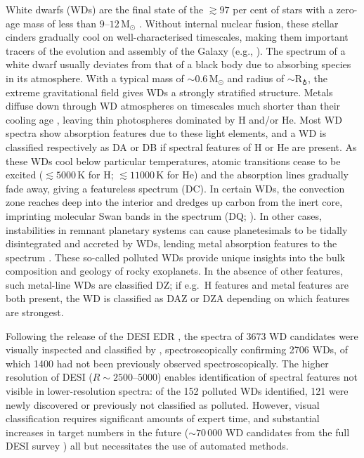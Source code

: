 \documentclass[fleqn,usenatbib]{mnras}
\begin{document}
White dwarfs (WDs) are the final state of the $\gtrsim97$ per cent of stars with a zero-age mass of less than $9$--$12\,\mathrm{M}_\odot$ \citep{lauffer18, althaus10, althaus21}.
Without internal nuclear fusion, these stellar cinders gradually cool on well-characterised timescales, making them important tracers of the evolution and assembly of the Galaxy (e.g., \citealt{winget87, tremblay14}).
The spectrum of a white dwarf usually deviates from that of a black body due to absorbing species in its atmosphere.
With a typical mass of $\sim0.6\,\mathrm{M}_\odot$ and radius of $\sim \mathrm{R}_{\earth}$, the extreme gravitational field gives WDs a strongly stratified structure.
Metals diffuse down through WD atmospheres on timescales much shorter than their cooling age \citep{schatzman45, paquette86, koester09, wyatt14}, leaving thin photospheres dominated by H and/or He.
Most WD spectra show absorption features due to these light elements, and a WD is classified respectively as DA or DB if spectral features of H or He are present.
As these WDs cool below particular temperatures, atomic transitions cease to be excited ($\lesssim5000\,\text{K}$ for H; $\lesssim 11000\,\text{K}$ for He) and the absorption lines gradually fade away, giving a featureless spectrum (DC).
In certain WDs, the convection zone reaches deep into the interior and dredges up carbon from the inert core, imprinting molecular  Swan bands in the spectrum (DQ; \citealt{fontaine84, koester82, koester20, blouin23}).
In other cases, instabilities in remnant planetary systems can cause planetesimals to be tidally disintegrated and accreted by WDs, lending metal absorption features to the spectrum \citep{bonsor11, frewen14, mustill18, maldonado20}.
These so-called polluted WDs provide unique insights into the bulk composition and geology of rocky exoplanets.
In the absence of other features, such metal-line WDs are classified DZ; if e.g.\ H features and metal features are both present, the WD is classified as DAZ or DZA depending on which features are strongest.

Following the release of the DESI EDR \citep{desiedr}, the spectra of 3673 WD candidates were visually inspected and classified by \citet{manser24}, spectroscopically confirming 2706 WDs, of which 1400 had not been previously observed spectroscopically.
The higher resolution of DESI ($R\sim2500$--$5000$) enables identification of spectral features not visible in lower-resolution spectra: of the 152 polluted WDs identified, 121 were newly discovered or previously not classified as polluted.
However, visual classification requires significant amounts of expert time, and substantial increases in target numbers in the future ($\sim70\,000$ WD candidates from the full DESI survey \citealt{cooper23}) all but necessitates the use of automated methods.
\end{document}
